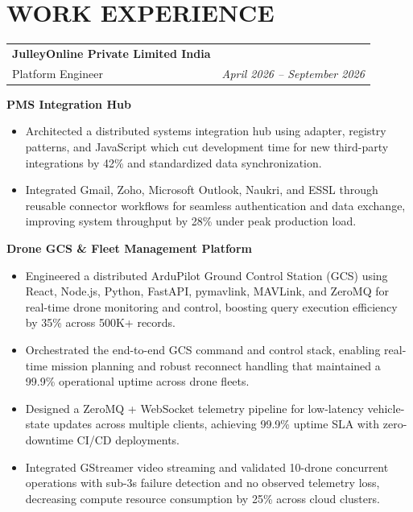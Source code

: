 \documentclass[a4paper,10pt]{article}
\makeatletter
\newcommand{\resumeSubheading}[4]{
  \vspace{2.5pt}\nopagebreak[3]
  \begin{tabular*}{1.0\textwidth}[t]{l@{\extracolsep{\fill}}r}
    \textbf{#1} & \textit{\small #2} \\[-1.5pt]
    {\small #3} & \textit{\small #4}
  \end{tabular*}\nopagebreak[4]
}
\makeatother
\begin{document}
\section{WORK EXPERIENCE}
\resumeSubheading
  {JulleyOnline Private Limited India}{}
  {Platform Engineer}{April 2026 -- September 2026}
\vspace{2.0pt}
\noindent \textbf{PMS Integration Hub}
\vspace{1pt}
\begin{itemize}[leftmargin=1.2em, itemsep=0.6pt, parsep=0pt, topsep=1.0pt, partopsep=0pt, label=\textbullet]
  \item Architected a distributed systems integration hub using adapter, registry patterns, and JavaScript which cut development time for new third-party integrations by 42\% and standardized data synchronization.
  \item Integrated Gmail, Zoho, Microsoft Outlook, Naukri, and ESSL through reusable connector workflows for seamless authentication and data exchange, improving system throughput by 28\% under peak production load.
\end{itemize}
\vspace{2.0pt}
\noindent \textbf{Drone GCS \& Fleet Management Platform}
\vspace{1pt}
\begin{itemize}[leftmargin=1.2em, itemsep=0.6pt, parsep=0pt, topsep=1.0pt, partopsep=0pt, label=\textbullet]
  \item Engineered a distributed ArduPilot Ground Control Station (GCS) using React, Node.js, Python, FastAPI, pymavlink, MAVLink, and ZeroMQ for real-time drone monitoring and control, boosting query execution efficiency by 35\% across 500K+ records.
  \item Orchestrated the end-to-end GCS command and control stack, enabling real-time mission planning and robust reconnect handling that maintained a 99.9\% operational uptime across drone fleets.
  \item Designed a ZeroMQ + WebSocket telemetry pipeline for low-latency vehicle-state updates across multiple clients, achieving 99.9\% uptime SLA with zero-downtime CI/CD deployments.
  \item Integrated GStreamer video streaming and validated 10-drone concurrent operations with sub-3s failure detection and no observed telemetry loss, decreasing compute resource consumption by 25\% across cloud clusters.
\end{itemize}
\vspace{2.0pt}
\end{document}
